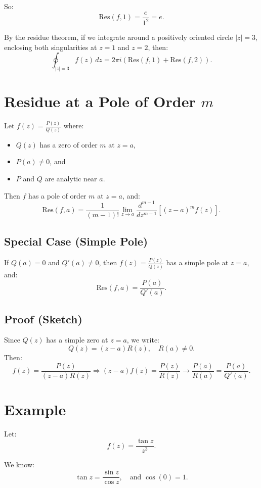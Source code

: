 \documentclass[12pt]{article}
\theoremstyle{definition} %
\theoremstyle{plain} %
\begin{document}
So:
\[
\text{Res}(f, 1) = \frac{e}{1^2} = e.
\]

By the residue theorem, if we integrate around a positively oriented circle $|z| = 3$, enclosing both singularities at $z = 1$ and $z = 2$, then:
\[
\oint_{|z|=3} f(z)\,dz = 2\pi i \left( \text{Res}(f, 1) + \text{Res}(f, 2) \right).
\]

\section*{Residue at a Pole of Order $m$}

Let $f(z) = \frac{P(z)}{Q(z)}$ where:
\begin{itemize}
    \item $Q(z)$ has a zero of order $m$ at $z = a$,
    \item $P(a) \neq 0$, and
    \item $P$ and $Q$ are analytic near $a$.
\end{itemize}

Then $f$ has a pole of order $m$ at $z = a$, and:
\[
\text{Res}(f, a) = \frac{1}{(m-1)!} \lim_{z \to a} \frac{d^{m-1}}{dz^{m-1}} \left[ (z - a)^m f(z) \right].
\]

\subsection*{Special Case (Simple Pole)}

If $Q(a) = 0$ and $Q'(a) \neq 0$, then $f(z) = \frac{P(z)}{Q(z)}$ has a simple pole at $z = a$, and:
\[
\text{Res}(f, a) = \frac{P(a)}{Q'(a)}.
\]

\subsection*{Proof (Sketch)}

Since $Q(z)$ has a simple zero at $z = a$, we write:
\[
Q(z) = (z - a) R(z), \quad R(a) \neq 0.
\]
Then:
\[
f(z) = \frac{P(z)}{(z - a) R(z)} \Rightarrow (z - a) f(z) = \frac{P(z)}{R(z)} \to \frac{P(a)}{R(a)} = \frac{P(a)}{Q'(a)}.
\]

\section*{Example}

Let:
\[
f(z) = \frac{\tan z}{z^3}.
\]

We know:
\[
\tan z = \frac{\sin z}{\cos z}, \quad \text{and } \cos(0) = 1.
\]
\end{document}
